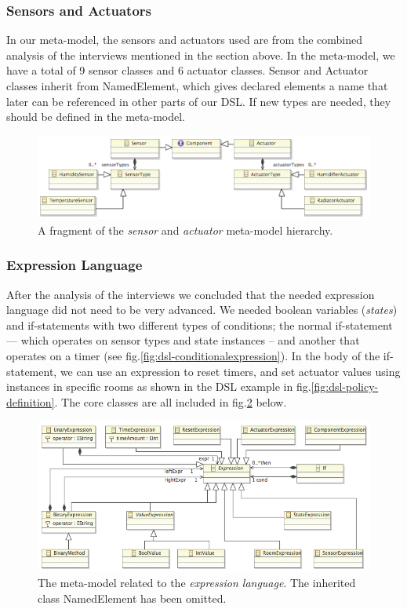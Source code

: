 \subsubsection{Sensors and Actuators}
In our meta-model, the sensors and actuators used are from the combined analysis of the interviews mentioned in the section above. In the meta-model, we have a total of 9 sensor classes and 6 actuator classes. Sensor and Actuator classes inherit from NamedElement, which gives declared elements a name that later can be referenced in other parts of our DSL. If new types are needed, they should be defined in the meta-model.

\begin{figure}[h]
	\centering
    \includegraphics[scale=.7]{ecore-sensors-actuators.png} 
	\caption{A fragment of the \textit{sensor} and \textit{actuator} meta-model hierarchy.}
	\label{fig:ecore-sensors-actuators}
\end{figure}


\subsubsection{Expression Language}
After the analysis of the interviews we concluded that the needed expression language did not need to be very advanced. We needed boolean variables (\textit{states}) and if-statements with two different types of conditions; the normal if-statement --- which operates on sensor types and state instances -- and another that operates on a timer (see fig.\ref{fig:dsl-conditionalexpression}). In the body of the if-statement, we can use an expression to reset timers, and set actuator values using instances in specific rooms as shown in the DSL example in fig.\ref{fig:dsl-policy-definition}. The core classes are all included in fig.\ref{fig:ecore-expression-language} below.

\begin{figure}[h]
  \centering
    \includegraphics[scale=.5]{ecore-expression-language.png} 
	\caption{The meta-model related to the \textit{expression language}. The inherited class NamedElement has been omitted.}
	\label{fig:ecore-expression-language}
\end{figure}

